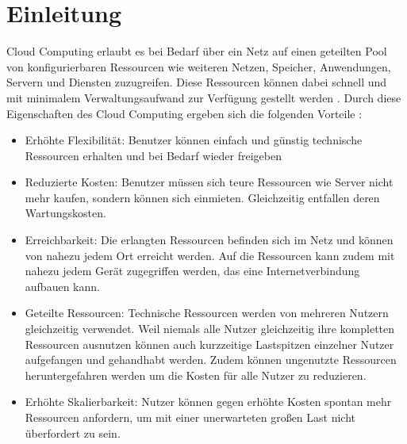 \section{Einleitung}


Cloud Computing erlaubt es bei Bedarf über ein Netz auf einen geteilten Pool von konfigurierbaren Ressourcen wie weiteren Netzen, Speicher, Anwendungen, Servern und Diensten zuzugreifen. Diese Ressourcen können dabei schnell und mit minimalem Verwaltungsaufwand zur Verfügung gestellt werden \cite{mell2011}. 
Durch diese Eigenschaften des Cloud Computing ergeben sich die folgenden Vorteile \cite{ganesh2014}:
\begin{itemize}
\item 
Erhöhte Flexibilität: Benutzer können einfach und günstig technische Ressourcen erhalten und bei Bedarf wieder freigeben
\item
Reduzierte Kosten: Benutzer müssen sich teure Ressourcen wie Server nicht mehr kaufen, sondern können sich einmieten. Gleichzeitig entfallen deren Wartungskosten. 
\item
Erreichbarkeit: Die erlangten Ressourcen befinden sich im Netz und können von nahezu jedem Ort erreicht werden. Auf die Ressourcen kann zudem mit nahezu jedem Gerät zugegriffen werden, das eine Internetverbindung aufbauen kann.
\item
Geteilte Ressourcen: Technische Ressourcen werden von mehreren Nutzern gleichzeitig verwendet. Weil niemals alle Nutzer gleichzeitig ihre kompletten Ressourcen ausnutzen können auch kurzzeitige Lastspitzen einzelner Nutzer aufgefangen und gehandhabt werden. Zudem können ungenutzte Ressourcen heruntergefahren werden um die Kosten für alle Nutzer zu reduzieren.
\item
Erhöhte Skalierbarkeit: Nutzer können gegen erhöhte Kosten spontan mehr Ressourcen anfordern, um mit einer unerwarteten großen Last nicht überfordert zu sein.
\end{itemize}

